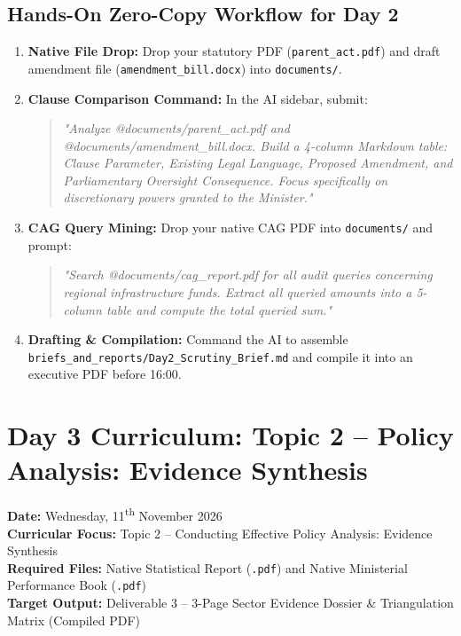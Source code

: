 \documentclass[11pt, a4paper]{report}
\begin{document}
\section{Hands-On Zero-Copy Workflow for Day 2}
\begin{enumerate}[label=\textbf{Step \arabic*:}]
    \item \textbf{Native File Drop:} Drop your statutory PDF (\texttt{parent\_act.pdf}) and draft amendment file (\texttt{amendment\_bill.docx}) into \texttt{documents/}.
    \item \textbf{Clause Comparison Command:} In the AI sidebar, submit:
    \begin{quote}
        \small\textit{"Analyze @documents/parent\_act.pdf and @documents/amendment\_bill.docx. Build a 4-column Markdown table: Clause Parameter, Existing Legal Language, Proposed Amendment, and Parliamentary Oversight Consequence. Focus specifically on discretionary powers granted to the Minister."}
    \end{quote}
    \item \textbf{CAG Query Mining:} Drop your native CAG PDF into \texttt{documents/} and prompt:
    \begin{quote}
        \small\textit{"Search @documents/cag\_report.pdf for all audit queries concerning regional infrastructure funds. Extract all queried amounts into a 5-column table and compute the total queried sum."}
    \end{quote}
    \item \textbf{Drafting \& Compilation:} Command the AI to assemble \texttt{briefs\_and\_reports/Day2\_Scrutiny\_Brief.md} and compile it into an executive PDF before 16:00.
\end{enumerate}

\newpage

\chapter{Day 3 Curriculum: Topic 2 -- Policy Analysis: Evidence Synthesis}
\textbf{Date:} Wednesday, 11\textsuperscript{th} November 2026\\
\textbf{Curricular Focus:} Topic 2 -- Conducting Effective Policy Analysis: Evidence Synthesis\\
\textbf{Required Files:} Native Statistical Report (\texttt{.pdf}) and Native Ministerial Performance Book (\texttt{.pdf})\\
\textbf{Target Output:} Deliverable 3 -- 3-Page Sector Evidence Dossier \& Triangulation Matrix (Compiled PDF)
\end{document}
